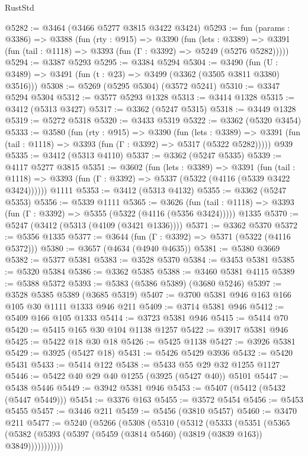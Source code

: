\begin{lexlean}{RustStd}
\begin{coremodule}
@5282 := @3464 (@3466 @5277 @3815 @3422 @3424)
@5293 := fun (params : @3386) =>
  @3388
    (fun (rty : @915) =>
    @3390
      (fun (lets : @3389) =>
      @3391 (fun (tail : @1118) => @3393 (fun (Γ : @3392) => @5249 (@5276 @5282)))))
@5294 := @3387 @5293
@5295 := @3384 @5294
@5304 := @3490 (fun (U : @3489) => @3491 (fun (t : @23) => @3499 (@3362 (@3505 @3811 @3380) @3516)))
@5308 := @5269 (@5295 @5304) (@3572 @5241)
@5310 := @3347 @5294 @5304
@5312 := @3577 @5293 @1328
@5313 := @3414 @1328
@5315 := @3412 (@5313 @3427)
@5317 := @3362 (@5247 @5315)
@5318 := @3449 @1328
@5319 := @5272 @5318
@5320 := @3433 @5319
@5322 := @3362 (@5320 @3454)
@5333 := @3580
    (fun (rty : @915) =>
    @3390
      (fun (lets : @3389) =>
      @3391 (fun (tail : @1118) => @3393 (fun (Γ : @3392) => @5317 (@5322 @5282)))))
    @939
@5335 := @3412 (@5313 @4110)
@5337 := @3362 (@5247 @5335)
@5339 := @4117 @5277 @3815
@5351 := @3602
    (fun (lets : @3389) =>
    @3391
      (fun (tail : @1118) => @3393 (fun (Γ : @3392) => @5337 (@5322 (@4116 (@5339 @3422 @3424))))))
    @1111
@5353 := @3412 (@5313 @4132)
@5355 := @3362 (@5247 @5353)
@5356 := @5339 @1111
@5365 := @3626
    (fun (tail : @1118) => @3393 (fun (Γ : @3392) => @5355 (@5322 (@4116 (@5356 @3424)))))
    @1335
@5370 := @5247 (@3412 (@5313 (@4109 (@3421 @1336))))
@5371 := @3362 @5370
@5372 := @5356 @1335
@5377 := @3644 (fun (Γ : @3392) => @5371 (@5322 (@4116 @5372)))
@5380 := @3657 (@4634 (@4940 @4635))
@5381 := @5380 @3669
@5382 := @5377 @5381
@5383 := @3528 @5370
@5384 := @3453 @5381
@5385 := @5320 @5384
@5386 := @3362 @5385
@5388 := @3460 @5381 @4115
@5389 := @5388 @5372
@5393 := @5383 (@5386 @5389) (@3680 @5246)
@5397 := @3528 @5385 @5389 (@3685 @5319)
@5407 := @3700 @5381 @946 @163 @166 @105 @30 @1111 @1333 @946 @211
@5409 := @3714 @5381 @946
@5412 := @5409 @166 @105 @1333
@5414 := @3723 @5381 @946
@5415 := @5414 @70
@5420 := @5415 @165 @30 @104 @1138 @1257
@5422 := @3917 @5381 @946
@5425 := @5422 @18 @30 @18
@5426 := @5425 @1138
@5427 := @3926 @5381
@5429 := @3925 (@5427 @18)
@5431 := @5426 @5429 @3936
@5432 := @5420 @5431
@5433 := @5414 @122
@5438 := @5433 @55 @29 @32 @1255 @1127
@5446 := @5422 @40 @29 @40 @1255 (@3925 (@5427 @40)) @5101
@5447 := @5438 @5446
@5449 := @3942 @5381 @946
@5453 := @5407 (@5412 (@5432 (@5447 @5449)))
@5454 := @3376 @163
@5455 := @3572 @5454
@5456 := @5453 @5455
@5457 := @3446 @211
@5459 := @5456 (@3810 @5457)
@5460 := @3470 @211
@5477 := @5240
    (@5266
      (@5308
        (@5310
          (@5312
            (@5333
              (@5351
                (@5365
                  (@5382 (@5393 (@5397 (@5459 (@3814 @5460) (@3819 (@3839 @163)) @3849)))))))))))

\end{coremodule}
\end{lexlean}
